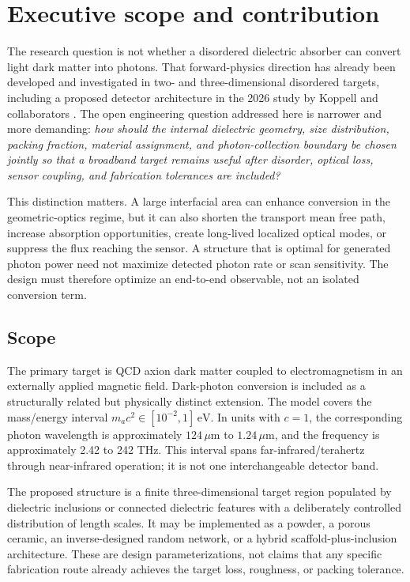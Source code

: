 \documentclass[10.5pt,a4paper]{article}
\newcommand{\eV}{\,\mathrm{eV}}
\newcommand{\um}{\,\mu\mathrm{m}}
\begin{document}
\section{Executive scope and contribution}
The research question is not whether a disordered dielectric absorber can convert light dark matter into photons. That forward-physics direction has already been developed and investigated in two- and three-dimensional disordered targets, including a proposed detector architecture in the 2026 study by Koppell and collaborators \parencite{Koppell2026}. The open engineering question addressed here is narrower and more demanding: \emph{how should the internal dielectric geometry, size distribution, packing fraction, material assignment, and photon-collection boundary be chosen jointly so that a broadband target remains useful after disorder, optical loss, sensor coupling, and fabrication tolerances are included?}

This distinction matters. A large interfacial area can enhance conversion in the geometric-optics regime, but it can also shorten the transport mean free path, increase absorption opportunities, create long-lived localized optical modes, or suppress the flux reaching the sensor. A structure that is optimal for generated photon power need not maximize detected photon rate or scan sensitivity. The design must therefore optimize an end-to-end observable, not an isolated conversion term.

\subsection{Scope}
The primary target is QCD axion dark matter coupled to electromagnetism in an externally applied magnetic field. Dark-photon conversion is included as a structurally related but physically distinct extension. The model covers the mass/energy interval $m_a c^2\in[10^{-2},1]\eV$. In units with $c=1$, the corresponding photon wavelength is approximately $124\um$ to $1.24\um$, and the frequency is approximately 2.42 to 242 THz. This interval spans far-infrared/terahertz through near-infrared operation; it is not one interchangeable detector band.

The proposed structure is a finite three-dimensional target region populated by dielectric inclusions or connected dielectric features with a deliberately controlled distribution of length scales. It may be implemented as a powder, a porous ceramic, an inverse-designed random network, or a hybrid scaffold-plus-inclusion architecture. These are design parameterizations, not claims that any specific fabrication route already achieves the target loss, roughness, or packing tolerance.
\end{document}
